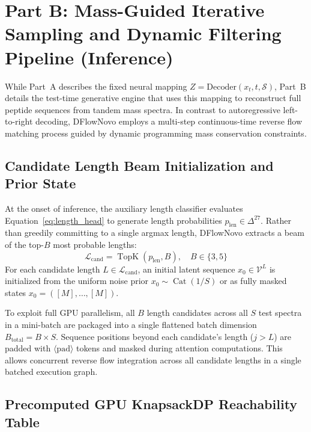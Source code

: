 \section{Part B: Mass-Guided Iterative Sampling and Dynamic Filtering Pipeline (Inference)}
\label{sec:part_b_pipeline}

While Part~A describes the fixed neural mapping $Z = \text{Decoder}(x_t, t, \mathcal{S})$, Part~B details the test-time generative engine that uses this mapping to reconstruct full peptide sequences from tandem mass spectra. In contrast to autoregressive left-to-right decoding, DFlowNovo employs a multi-step continuous-time reverse flow matching process guided by dynamic programming mass conservation constraints.

\subsection{Candidate Length Beam Initialization and Prior State}
\label{subsec:beam_init}

At the onset of inference, the auxiliary length classifier evaluates Equation~\ref{eq:length_head} to generate length probabilities $p_{\text{len}} \in \Delta^{27}$. Rather than greedily committing to a single argmax length, DFlowNovo extracts a beam of the top-$B$ most probable lengths:
\begin{equation}
\mathcal{L}_{\text{cand}} = \operatorname{TopK}\left( p_{\text{len}}, B \right), \quad B \in \{3, 5\}
\label{eq:topk_lengths}
\end{equation}
For each candidate length $L \in \mathcal{L}_{\text{cand}}$, an initial latent sequence $x_0 \in \mathcal{V}^L$ is initialized from the uniform noise prior $x_0 \sim \operatorname{Cat}(1/S)$ or as fully masked states $x_0 = ([M], \dots, [M])$. 

To exploit full GPU parallelism, all $B$ length candidates across all $S$ test spectra in a mini-batch are packaged into a single flattened batch dimension $B_{\text{total}} = B \times S$. Sequence positions beyond each candidate's length ($j > L$) are padded with $\langle\text{pad}\rangle$ tokens and masked during attention computations. This allows concurrent reverse flow integration across all candidate lengths in a single batched execution graph.

\subsection{Precomputed GPU KnapsackDP Reachability Table}
\label{subsec:knapsack_dp}

